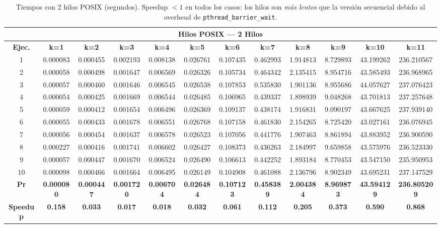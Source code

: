 \documentclass{article}
\begin{document}
\begin{table}[H]
\centering
\tiny
\begin{tabular}{|c|c|c|c|c|c|c|c|c|c|c|c|}
\hline
\multicolumn{12}{|c|}{\textbf{Hilos POSIX --- 2 Hilos}} \\
\hline
\textbf{Ejec.} & \textbf{k=1} & \textbf{k=2} & \textbf{k=3} & \textbf{k=4} & \textbf{k=5} & \textbf{k=6} & \textbf{k=7} & \textbf{k=8} & \textbf{k=9} & \textbf{k=10} & \textbf{k=11} \\
\hline
1  & 0.000083 & 0.000455 & 0.002193 & 0.008138 & 0.026761 & 0.107435 & 0.462993 & 1.914813 & 8.729893 & 43.199262 & 236.210567 \\
2  & 0.000058 & 0.000498 & 0.001647 & 0.006569 & 0.026326 & 0.105734 & 0.464342 & 2.135415 & 8.954716 & 43.585493 & 236.968965 \\
3  & 0.000057 & 0.000460 & 0.001646 & 0.006545 & 0.026538 & 0.107853 & 0.535830 & 1.901136 & 8.955686 & 44.057627 & 237.076423 \\
4  & 0.000054 & 0.000425 & 0.001669 & 0.006544 & 0.026485 & 0.106965 & 0.439337 & 1.898939 & 9.048268 & 43.701813 & 237.257648 \\
5  & 0.000059 & 0.000412 & 0.001654 & 0.006496 & 0.026369 & 0.109137 & 0.438174 & 1.916831 & 9.090197 & 43.667625 & 237.939140 \\
6  & 0.000055 & 0.000433 & 0.001678 & 0.006551 & 0.026768 & 0.107158 & 0.461830 & 2.154265 & 8.725420 & 43.027161 & 236.076945 \\
7  & 0.000056 & 0.000454 & 0.001637 & 0.006578 & 0.026523 & 0.107056 & 0.441776 & 1.907463 & 8.861894 & 43.883952 & 236.900590 \\
8  & 0.000227 & 0.000416 & 0.001741 & 0.006602 & 0.026427 & 0.108373 & 0.436263 & 2.184997 & 9.659858 & 43.575976 & 236.523330 \\
9  & 0.000057 & 0.000447 & 0.001670 & 0.006524 & 0.026490 & 0.106613 & 0.442252 & 1.893184 & 8.770453 & 43.547150 & 235.950953 \\
10 & 0.000098 & 0.000466 & 0.001664 & 0.006495 & 0.026149 & 0.104908 & 0.461088 & 2.136796 & 8.902349 & 43.695231 & 237.147529 \\
\hline
\textbf{Pr} & \textbf{0.000080} & \textbf{0.000447} & \textbf{0.001720} & \textbf{0.006704} & \textbf{0.026484} & \textbf{0.107123} & \textbf{0.458389} & \textbf{2.004384} & \textbf{8.969873} & \textbf{43.594129} & \textbf{236.805209} \\
\hline
\textbf{Speedup} & \textbf{0.158} & \textbf{0.033} & \textbf{0.017} & \textbf{0.018} & \textbf{0.032} & \textbf{0.061} & \textbf{0.112} & \textbf{0.205} & \textbf{0.373} & \textbf{0.590} & \textbf{0.868} \\
\hline
\end{tabular}
\caption{Tiempos con 2 hilos POSIX (segundos). Speedup $<1$ en todos los casos: los hilos son \emph{más lentos} que la versión secuencial debido al overhead de \texttt{pthread\_barrier\_wait}.}
\label{tab:t2}
\end{table}
\end{document}
